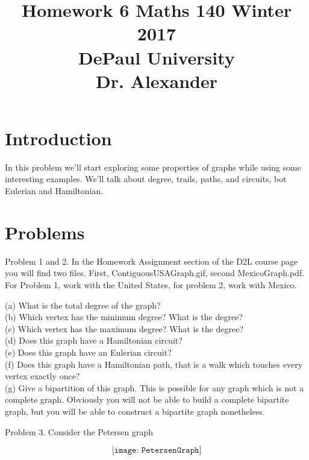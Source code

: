 \documentclass[16 pt]{amsart}
\theoremstyle{definition}
\theoremstyle{remark}
\numberwithin{equation}{subsection}
\begin{document}
\title{Homework 6 Maths 140 Winter 2017 \\ DePaul University\\Dr. Alexander}
\maketitle

\section{Introduction}
In this problem we'll start exploring some properties of graphs while using some interesting examples.  We'll talk about degree, trails, paths, and circuits, bot Eulerian and Hamiltonian.

\section{Problems}

Problem 1 and 2.  In the Homework Assignment section of the D2L course page you will find two files.  First, ContiguousUSAGraph.gif, second MexicoGraph.pdf.  For Problem 1, work with the United States\cite{USA}, for problem 2, work with Mexico.

(a) What is the total degree of the graph?\\

(b) Which vertex has the minimum degree? What is the degree?\\

(c) Which vertex has the maximum degree?  What is the degree?\\

(d) Does this graph have a Hamiltonian circuit?\\

(e) Does this graph have an Eulerian circuit?\\

(f) Does this graph have a Hamiltonian path, that is a walk which touches every vertex exactly once?\\

(g) Give a bipartition of this graph.  This is possible for any graph which is not a complete graph.  Obviously you will not be able to build a complete bipartite graph, but you will be able to construct a bipartite graph nonetheless.\\

\newpage

Problem 3.  Consider the Petersen graph

\[
\texttt{[image: PetersenGraph]}
\]
\end{document}
